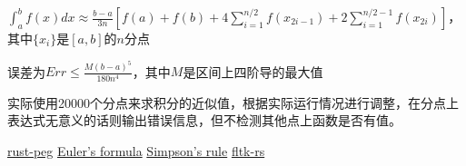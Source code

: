 \documentclass[UTF8,11pt]{ctexart}
\begin{document}
        \noindent $\int_{a}^{b}f(x)dx \approx \frac{b-a}{3n}[f(a)+f(b)+4\sum_{i=1}^{n/2}f(x_{2i-1})+2\sum_{i=1}^{n/2-1}f(x_{2i})]$，其中$\{x_i\}$是$[a,b]$的$n$分点

        \noindent 误差为$Err \leq \frac{M(b-a)^5}{180n^4}$，其中$M$是区间上四阶导的最大值

        实际使用20000个分点来求积分的近似值，根据实际运行情况进行调整，在分点上表达式无意义的话则输出错误信息，但不检测其他点上函数是否有值。
\begin{thebibliography}{80}
     \href{https://github.com/kevinmehall/rust-peg}{rust-peg}
     \href{https://en.wikipedia.org/wiki/Euler%27s_formula}{Euler's formula}
     \href{https://en.wikipedia.org/wiki/Simpson%27s_rule}{Simpson's rule}
     \href{https://github.com/fltk-rs/fltk-rs}{fltk-rs}
\end{thebibliography}
\end{document}
